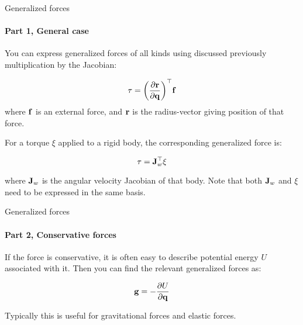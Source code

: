 \documentclass{beamer}
\begin{document}
\begin{frame}{Generalized forces}
	\framesubtitle{Part 1, General case}
	\begin{flushleft}
		
		You can express generalized forces of all kinds using discussed previously multiplication by the Jacobian:
		
\begin{equation}
	\tau = \bigg( \frac{\partial \mathbf{r} }{\partial \mathbf{q}} \bigg) ^\top \mathbf{f}
\end{equation}
		where $\mathbf{f}$ is an external force, and $\mathbf{r}$ is the radius-vector giving position of that force.
		
		\bigskip
		
		For a torque $\xi$ applied to a rigid body, the corresponding generalized force is:
		
		\begin{equation}
			\tau = \mathbf{J}_w^\top \xi
		\end{equation}
		
		where $\mathbf{J}_w$ is the angular velocity Jacobian of that body. Note that both $\mathbf{J}_w$ and $\xi$ need to be expressed in the same basis.
		
		
	\end{flushleft}
\end{frame}



\begin{frame}{Generalized forces}
	\framesubtitle{Part 2, Conservative forces}
	\begin{flushleft}
		
		If the force is conservative, it is often easy to describe potential energy $U$ associated with it. Then you can find the relevant generalized forces as:
		
		\begin{equation}
			\mathbf{g} = -\frac{\partial U }{\partial \mathbf{q}}
		\end{equation}
		
		Typically this is useful for gravitational forces and elastic forces.
		
	\end{flushleft}
\end{frame}
\end{document}
